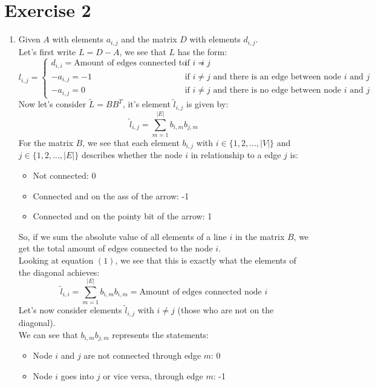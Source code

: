 \documentclass[11pt, legalpaper]{article}
\begin{document}
\section{Exercise 2}
\begin{enumerate}
    \item Given $A$ with elements $a_{i,j}$ and the matrix $D$ with elements $d_{i,j}$.\\
    Let's first write $L=D-A$, we see that $L$ has the form:
    $$l_{i,j}=\begin{cases}
        d_{i,i} = \text{Amount of edges connected to node $i$} & \text{if } i=j\\
        -a_{i,j}=-1 & \text{if } i \ne j \text{ and there is an edge between node $i$ and $j$}\\
        -a_{i,j}=0 & \text{if } i \ne j \text{ and there is no edge between node $i$ and $j$}
    \end{cases}$$
    Now let's consider $\tilde{L}=BB^T$, it's element $\tilde{l}_{i,j}$ is given by:
    \begin{equation}\tilde{l}_{i,j}=\sum_{m=1}^{|E|}b_{i,m}b_{j,m}\end{equation}
    For the matrix $B$, we see that each element $b_{i,j}$ with $i \in \{1, 2, ...,|V|\}$ and $j \in \{1, 2, ...,|E|\}$ describes whether the node $i$ in relationship to a edge $j$ is:
    \begin{itemize}
        \item Not connected: 0
        \item Connected and on the ass of the arrow: -1
        \item Connected and on the pointy bit of the arrow: 1
    \end{itemize}
    So, if we sum the absolute value of all elements of a line $i$ in the matrix $B$, we get the total amount of edges connected to the node $i$.\\
    Looking at equation $(1)$, we see that this is exactly what the elements of the diagonal achieves: 
    $$\tilde{l}_{i,i}=\sum_{m=1}^{|E|}b_{i,m}b_{i,m}=\text{Amount of edges connected node $i$} $$
    Let's now consider elements $\tilde{l}_{i,j}$ with $i \ne j$ (those who are not on the diagonal). \\
    We can see that $b_{i,m}b_{j,m}$ represents the statements:
    \begin{itemize}
        \item Node $i$ and $j$ are not connected through edge $m$: 0
        \item Node $i$ goes into $j$ or vice versa, through edge $m$: -1

\end{itemize}
\end{enumerate}
\end{document}
